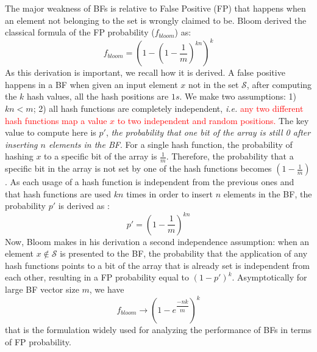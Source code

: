 The major weakness of BFs is relative to False Positive (FP) that happens when an element not belonging to the set is wrongly claimed to be. Bloom derived the classical formula of the FP probability ($f_{bloom}$) as:
\begin{equation}
\label{oldFormula}
f_{bloom}= \left(1 - \left(1 - \frac{1}{m}\right)^{kn}\right)^k
\end{equation}
As this derivation is important, we recall how it is derived. A false positive happens in a BF when given an input element $x$ not in the set $\mathcal{S}$, after computing the $k$ hash values, all the hash positions are $1s$. We make two assumptions: 1) $kn<m$; 2) all hash functions are completely independent, {\em i.e.} \textcolor{red}{any two different hash functions map a value $x$ to two independent and random positions.}
The key value to compute here is $p'$, \textit{the probability that one bit of the array is still 0 after inserting $n$ elements in the BF}. For a single hash function, the probability of hashing $x$ to a specific bit of the array is $\frac{1}{m}$. Therefore, the probability that a specific bit in the array is not set by one of the hash functions becomes $(1-\frac{1}{m})$. As each usage of a hash function is independent from the previous ones and that hash functions are used $kn$ times in order to insert $n$ elements in the BF, the probability $p'$ is derived as :
\begin{equation}
\label{p'form}
p'=\left(1-\frac{1}{m}\right)^{kn}
\end{equation}
Now, Bloom makes in his derivation a second independence assumption: when an element $x \notin \mathcal{S}$ is presented to the BF, the probability that the application of any hash functions points to a bit of the array that is already set is independent from each other, resulting in a FP probability equal to $(1-p')^k$. Asymptotically for large BF vector size $m$, we have
\begin{equation}
\label{fBloom}
f_{bloom} \rightarrow \left( 1-e^{\dfrac{-nk}{m}} \right)^k
\end{equation}
that is the formulation widely used for analyzing the performance of BFs in terms of FP probability.
